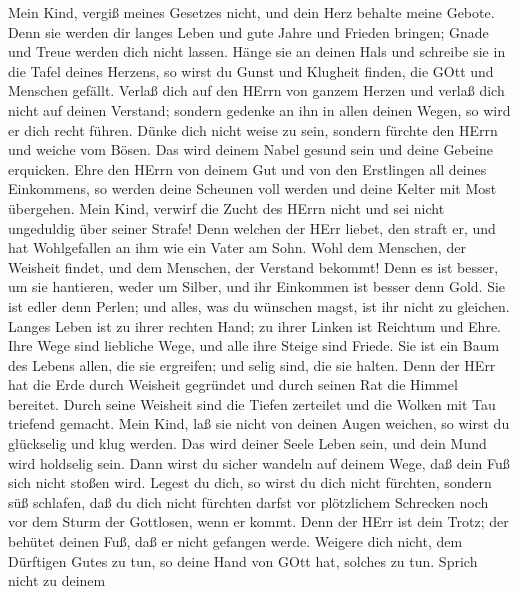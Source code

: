  Mein Kind, vergiß meines Gesetzes nicht, und dein Herz
behalte meine Gebote.  Denn sie werden dir langes Leben und
gute Jahre und Frieden bringen;  Gnade und Treue werden dich
nicht lassen. Hänge sie an deinen Hals und schreibe sie in die Tafel
deines Herzens,  so wirst du Gunst und Klugheit finden, die
GOtt und Menschen gefällt.  Verlaß dich auf den HErrn von
ganzem Herzen und verlaß dich nicht auf deinen Verstand; 
sondern gedenke an ihn in allen deinen Wegen, so wird er dich recht
führen.  Dünke dich nicht weise zu sein, sondern fürchte den
HErrn und weiche vom Bösen.  Das wird deinem Nabel gesund
sein und deine Gebeine erquicken.  Ehre den HErrn von deinem
Gut und von den Erstlingen all deines Einkommens,  so
werden deine Scheunen voll werden und deine Kelter mit Most übergehen.
 Mein Kind, verwirf die Zucht des HErrn nicht und sei nicht
ungeduldig über seiner Strafe!  Denn welchen der HErr
liebet, den straft er, und hat Wohlgefallen an ihm wie ein Vater am
Sohn.  Wohl dem Menschen, der Weisheit findet, und dem
Menschen, der Verstand bekommt!  Denn es ist besser, um sie
hantieren, weder um Silber, und ihr Einkommen ist besser denn Gold.
 Sie ist edler denn Perlen; und alles, was du wünschen
magst, ist ihr nicht zu gleichen.  Langes Leben ist zu
ihrer rechten Hand; zu ihrer Linken ist Reichtum und Ehre. 
Ihre Wege sind liebliche Wege, und alle ihre Steige sind Friede.
 Sie ist ein Baum des Lebens allen, die sie ergreifen; und
selig sind, die sie halten.  Denn der HErr hat die Erde
durch Weisheit gegründet und durch seinen Rat die Himmel bereitet.
 Durch seine Weisheit sind die Tiefen zerteilet und die
Wolken mit Tau triefend gemacht.  Mein Kind, laß sie nicht
von deinen Augen weichen, so wirst du glückselig und klug werden.
 Das wird deiner Seele Leben sein, und dein Mund wird
holdselig sein.  Dann wirst du sicher wandeln auf deinem
Wege, daß dein Fuß sich nicht stoßen wird.  Legest du dich,
so wirst du dich nicht fürchten, sondern süß schlafen,  daß
du dich nicht fürchten darfst vor plötzlichem Schrecken noch vor dem
Sturm der Gottlosen, wenn er kommt.  Denn der HErr ist dein
Trotz; der behütet deinen Fuß, daß er nicht gefangen werde.
 Weigere dich nicht, dem Dürftigen Gutes zu tun, so deine
Hand von GOtt hat, solches zu tun.  Sprich nicht zu deinem
